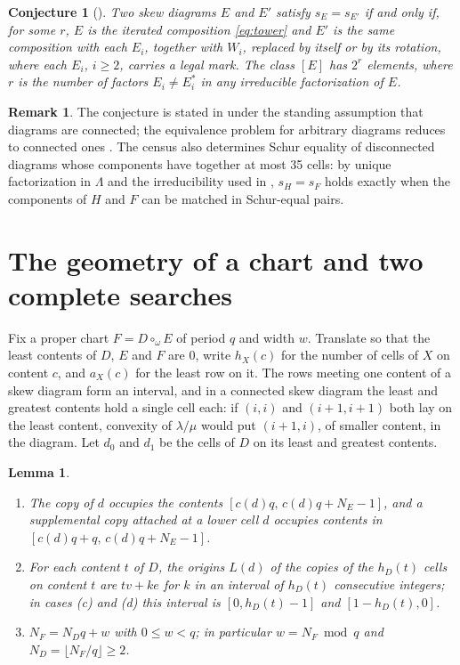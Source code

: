 \documentclass[11pt,a4paper]{amsart}
\numberwithin{equation}{section}
\theoremstyle{plain}
\newtheorem{lemma}[theorem]{Lemma}
\newtheorem{conjecture}[theorem]{Conjecture}
\theoremstyle{definition}
\newtheorem{remark}[theorem]{Remark}
\newcommand{\Lam}{\Lambda}
\begin{document}
\begin{conjecture}[{\cite[Conj.~5.7]{McNamara2009Classification}}]\label{conj:mvw}
Two skew diagrams \(E\) and \(E'\) satisfy \(s_E=s_{E'}\) if and only if, for some \(r\), \(E\) is the iterated composition \eqref{eq:tower} and \(E'\) is the same composition with each \(E_i\), together with \(W_i\), replaced by itself or by its rotation, where each \(E_i\), \(i\ge2\), carries a legal mark.  The class \([E]\) has \(2^r\) elements, where \(r\) is the number of factors \(E_i\ne E_i^*\) in any irreducible factorization of \(E\).
\end{conjecture}

\begin{remark}\label{rem:disconnected}
The conjecture is stated in \cite{McNamara2009Classification} under the standing assumption that diagrams are connected; the equivalence problem for arbitrary diagrams reduces to connected ones \cite[Prop.~3.2]{McNamara2009Classification}.  The census also determines Schur equality of disconnected diagrams whose components have together at most 35 cells: by unique factorization in \(\Lam\) and the irreducibility used in , \(s_H=s_F\) holds exactly when the components of \(H\) and \(F\) can be matched in Schur-equal pairs.
\end{remark}

\section{The geometry of a chart and two complete searches}\label{sec:roots}

Fix a proper chart \(F=D\circ_\omega E\) of period \(q\) and width \(w\).  Translate so that the least contents of \(D\), \(E\) and \(F\) are \(0\), write \(h_X(c)\) for the number of cells of \(X\) on content \(c\), and \(a_X(c)\) for the least row on it.  The rows meeting one content of a skew diagram form an interval, and in a connected skew diagram the least and greatest contents hold a single cell each: if \((i,i)\) and \((i+1,i+1)\) both lay on the least content, convexity of \(\lambda/\mu\) would put \((i+1,i)\), of smaller content, in the diagram.  Let \(d_0\) and \(d_1\) be the cells of \(D\) on its least and greatest contents.

\begin{lemma}\label{lem:copies}
\begin{enumerate}
\item[(i)] The copy of \(d\) occupies the contents \([c(d)q,\,c(d)q+N_E-1]\), and a supplemental copy attached at a lower cell \(d\) occupies contents in \([c(d)q+q,\,c(d)q+N_E-1]\).
\item[(ii)] For each content \(t\) of \(D\), the origins \(L(d)\) of the copies of the \(h_D(t)\) cells on content \(t\) are \(tv+ke\) for \(k\) in an interval of \(h_D(t)\) consecutive integers; in cases (c) and (d) this interval is \([0,h_D(t)-1]\) and \([1-h_D(t),0]\).
\item[(iii)] \(N_F=N_Dq+w\) with \(0\le w<q\); in particular \(w=N_F\bmod q\) and \(N_D=\lfloor N_F/q\rfloor\ge2\).
\end{enumerate}
\end{lemma}
\end{document}
